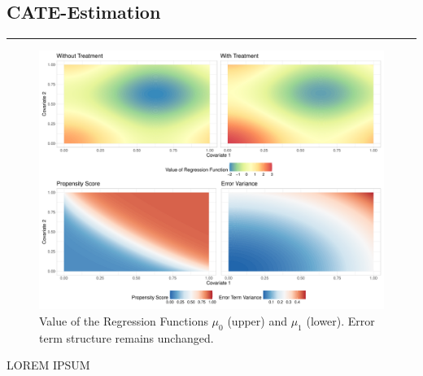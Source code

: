 \subsection{CATE-Estimation}
\hrule

\begin{figure}[H]
	\centering
	\includegraphics[width = \textwidth]{../Graphics/CATE_Exmp1.pdf}
	\caption{Value of the Regression Functions $\mu_0$ (upper) and $\mu_1$ (lower).	Error term structure remains unchanged.}
	\label{fig:CATE_surfaces}
\end{figure}

{\color{red} LOREM IPSUM}